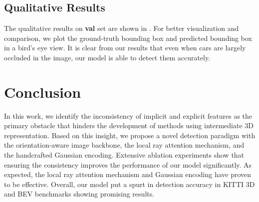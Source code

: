 \documentclass[10pt,twocolumn,letterpaper]{article}
\begin{document}
\subsection{Qualitative Results}
The qualitative results on \textbf{val} set are shown in . For better visualization and comparison, we plot the ground-truth bounding box and predicted bounding box in a bird's eye view. It is clear from our results that even when cars are largely occluded in the image, our model is able to detect them accurately. 
\section{Conclusion}
\label{sec:Conclusion}
In this work, we identify the inconsistency of implicit and explicit features as the primary obstacle that hinders the development of methods using intermediate 3D representation. Based on this insight, we propose a novel detection paradigm with the orientation-aware image backbone, the local ray attention mechanism, and the handcrafted Gaussian encoding. Extensive ablation experiments show that ensuring the consistency improves the performance of our model significantly. As expected, the local ray attention mechanism and Gaussian encoding have proven to be effective. Overall, our model put a spurt in detection accuracy in KITTI 3D and BEV benchmarks showing promising results. 

{\small


}
\end{document}
